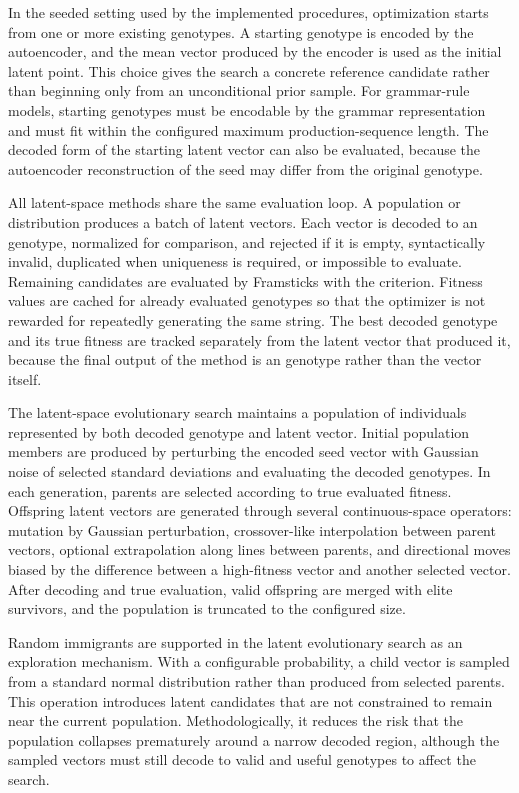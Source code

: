 In the seeded setting used by the implemented procedures, optimization starts from one or more existing genotypes. A starting genotype is encoded by the autoencoder, and the mean vector produced by the encoder is used as the initial latent point. This choice gives the search a concrete reference candidate rather than beginning only from an unconditional prior sample. For grammar-rule models, starting genotypes must be encodable by the grammar representation and must fit within the configured maximum production-sequence length. The decoded form of the starting latent vector can also be evaluated, because the autoencoder reconstruction of the seed may differ from the original genotype.

All latent-space methods share the same evaluation loop. A population or distribution produces a batch of latent vectors. Each vector is decoded to an \fone{} genotype, normalized for comparison, and rejected if it is empty, syntactically invalid, duplicated when uniqueness is required, or impossible to evaluate. Remaining candidates are evaluated by Framsticks with the \vertpos{} criterion. Fitness values are cached for already evaluated genotypes so that the optimizer is not rewarded for repeatedly generating the same string. The best decoded genotype and its true fitness are tracked separately from the latent vector that produced it, because the final output of the method is an \fone{} genotype rather than the vector itself.

The latent-space evolutionary search maintains a population of individuals represented by both decoded genotype and latent vector. Initial population members are produced by perturbing the encoded seed vector with Gaussian noise of selected standard deviations and evaluating the decoded genotypes. In each generation, parents are selected according to true evaluated fitness. Offspring latent vectors are generated through several continuous-space operators: mutation by Gaussian perturbation, crossover-like interpolation between parent vectors, optional extrapolation along lines between parents, and directional moves biased by the difference between a high-fitness vector and another selected vector. After decoding and true evaluation, valid offspring are merged with elite survivors, and the population is truncated to the configured size.

Random immigrants are supported in the latent evolutionary search as an exploration mechanism. With a configurable probability, a child vector is sampled from a standard normal distribution rather than produced from selected parents. This operation introduces latent candidates that are not constrained to remain near the current population. Methodologically, it reduces the risk that the population collapses prematurely around a narrow decoded region, although the sampled vectors must still decode to valid and useful genotypes to affect the search.

